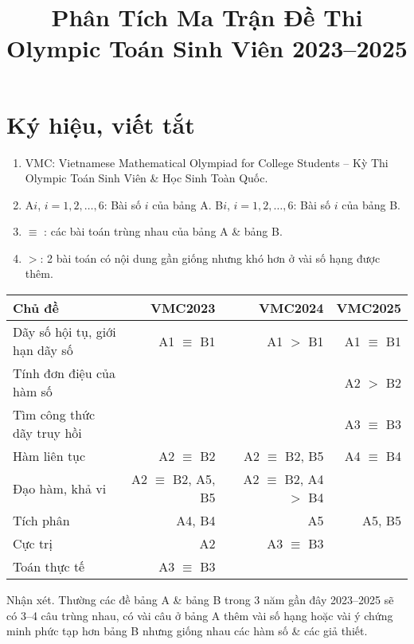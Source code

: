 \documentclass[12pt,landscape,a4paper]{article}
\title{Phân Tích Ma Trận Đề Thi Olympic Toán Sinh Viên 2023--2025}
\begin{document}
\maketitle


\section*{Ký hiệu, viết tắt}

\begin{enumerate}
	\item VMC: Vietnamese Mathematical Olympiad for College Students -- Kỳ Thi Olympic Toán Sinh Viên \& Học Sinh Toàn Quốc.
	\item A$i$, $i = 1,2,\ldots,6$: Bài số $i$ của bảng A. B$i$, $i = 1,2,\ldots,6$: Bài số $i$ của bảng B.
	\item  $\equiv$ : các bài toán trùng nhau của bảng A \& bảng B.
	\item $>$: 2 bài toán có nội dung gần giống nhưng khó hơn ở vài số hạng được thêm.
\end{enumerate}


\begin{table}[H]
	\centering
	\begin{tabular}{|l|r|r|r|}
		\hline
		Chủ đề & VMC2023 & VMC2024 & VMC2025 \\
		\hline
		Dãy số hội tụ, giới hạn dãy số & A1 $\equiv$ B1 & A1 $>$ B1 & A1 $\equiv$ B1 \\
		\hline
		Tính đơn điệu của hàm số &  &  & A2 $>$ B2 \\
		\hline
		Tìm công thức dãy truy hồi &  &  & A3 $\equiv$ B3 \\
		\hline
		Hàm liên tục & A2 $\equiv$ B2 & A2 $\equiv$ B2, B5 & A4 $\equiv$ B4 \\
		\hline
		Đạo hàm, khả vi & A2 $\equiv$ B2, A5, B5 & A2 $\equiv$ B2, A4 $>$ B4 &  \\
		\hline
		Tích phân & A4, B4 & A5 & A5, B5 \\
		\hline
		Cực trị & A2 & A3 $\equiv$ B3 &  \\
		\hline
		Toán thực tế & A3 $\equiv$ B3 &  &  \\
		\hline
	\end{tabular}
\end{table}
{\sf Nhận xét.} Thường các đề bảng A \& bảng B trong 3 năm gần đây 2023--2025 sẽ có 3--4 câu trùng nhau, có vài câu ở bảng A thêm vài số hạng hoặc vài ý chứng minh phức tạp hơn bảng B nhưng giống nhau các hàm số \& các giả thiết.
\end{document}

